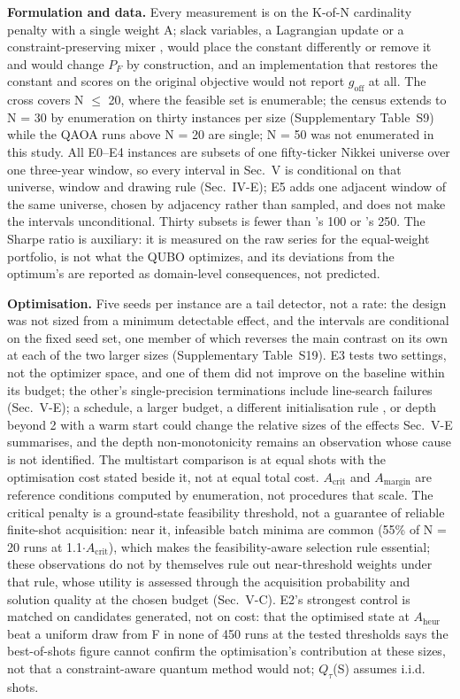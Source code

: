 \documentclass{ieeeaccess}
\begin{document}
\textbf{Formulation and data.} Every measurement is on the K-of-N cardinality penalty with a single weight A; slack variables, a Lagrangian update or a constraint-preserving mixer \cite{ref45}, \cite{ref46} would place the constant differently or remove it and would change $P_{F}$ by construction, and an implementation that restores the constant and scores on the original objective would not report $g_{\mathrm{off}}$ at all. The cross covers N $\leq$ 20, where the feasible set is enumerable; the census extends to N = 30 by enumeration on thirty instances per size (Supplementary Table~S9) while the QAOA runs above N = 20 are single; N = 50 was not enumerated in this study. All E0--E4 instances are subsets of one fifty-ticker Nikkei universe over one three-year window, so every interval in Sec.~V is conditional on that universe, window and drawing rule (Sec.~IV-E); E5 adds one adjacent window of the same universe, chosen by adjacency rather than sampled, and does not make the intervals unconditional. Thirty subsets is fewer than \cite{ref15}'s 100 or \cite{ref8}'s 250. The Sharpe ratio is auxiliary: it is measured on the raw series for the equal-weight portfolio, is not what the QUBO optimizes, and its deviations from the optimum's are reported as domain-level consequences, not predicted.


\textbf{Optimisation.} Five seeds per instance are a tail detector, not a rate: the design was not sized from a minimum detectable effect, and the intervals are conditional on the fixed seed set, one member of which reverses the main contrast on its own at each of the two larger sizes (Supplementary Table~S19). E3 tests two settings, not the optimizer space, and one of them did not improve on the baseline within its budget; the other's single-precision terminations include line-search failures (Sec.~V-E); a schedule, a larger budget, a different initialisation rule \cite{ref29}, \cite{ref30} or depth beyond 2 with a warm start could change the relative sizes of the effects Sec.~V-E summarises, and the depth non-monotonicity remains an observation whose cause is not identified. The multistart comparison is at equal shots with the optimisation cost stated beside it, not at equal total cost. $A_{\mathrm{crit}}$ and $A_{\mathrm{margin}}$ are reference conditions computed by enumeration, not procedures that scale. The critical penalty is a ground-state feasibility threshold, not a guarantee of reliable finite-shot acquisition: near it, infeasible batch minima are common (55\% of N = 20 runs at 1.1$\cdot$$A_{\mathrm{crit}}$), which makes the feasibility-aware selection rule essential; these observations do not by themselves rule out near-threshold weights under that rule, whose utility is assessed through the acquisition probability and solution quality at the chosen budget (Sec.~V-C). E2's strongest control is matched on candidates generated, not on cost: that the optimised state at $A_{\mathrm{heur}}$ beat a uniform draw from F in none of 450 runs at the tested thresholds says the best-of-shots figure cannot confirm the optimisation's contribution at these sizes, not that a constraint-aware quantum method would not; $Q_{\tau}$(S) assumes i.i.d. shots.
\end{document}

